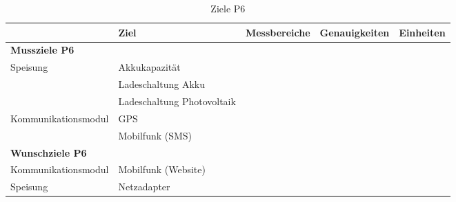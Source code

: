 \begin{table}[htbp]
  \centering
  \caption{Ziele P6}
  \small
    \begin{tabular}{l|l|r|r|r}
          & \textbf{Ziel} & \multicolumn{1}{l|}{\textbf{Messbereiche}} & \multicolumn{1}{l|}{\textbf{Genauigkeiten}} & \multicolumn{1}{l}{\textbf{Einheiten}} \\
    \toprule
    \multicolumn{1}{l}{\textbf{Mussziele P6}} & \multicolumn{1}{r}{} & \multicolumn{1}{r}{} & \multicolumn{1}{r}{} &  \\
    \toprule
    Speisung & Akkukapazität &       &       &  \\
\cline{2-5}          & Ladeschaltung Akku &       &       &  \\
\cline{2-5}           & Ladeschaltung Photovoltaik &       &       &  \\
    \hline
    Kommunikationsmodul & GPS   &       &       &  \\
\cline{2-5}          & Mobilfunk (SMS) &       &       &  \\
    \bottomrule
    \multicolumn{1}{l}{\textbf{Wunschziele P6}} & \multicolumn{1}{r}{} & \multicolumn{1}{r}{} & \multicolumn{1}{r}{} &  \\
    \toprule
    Kommunikationsmodul & Mobilfunk (Website) &       &       &  \\
    \hline
    Speisung & Netzadapter &       &       &  \\
    \bottomrule
    \end{tabular}%
  \label{tab:ZieleP6}%
\end{table}%

